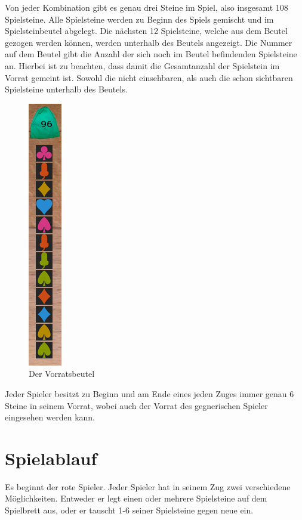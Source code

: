 \documentclass[a4paper, ngerman]{scrartcl}
\begin{document}
Von jeder Kombination gibt es genau drei Steine im Spiel, also insgesamt 108 Spielsteine. Alle Spielsteine werden zu Beginn des Spiels gemischt und im Spielsteinbeutel abgelegt. Die nächsten 12 Spielsteine, welche aus dem Beutel gezogen werden können, werden unterhalb des Beutels angezeigt. Die Nummer auf dem Beutel gibt die Anzahl der sich noch im Beutel befindenden Spielsteine an. Hierbei ist zu beachten, dass damit die Gesamtanzahl der Spielstein im Vorrat gemeint ist. Sowohl die nicht einsehbaren, als auch die schon sichtbaren Spielsteine unterhalb des Beutels.\\

\begin{figure}[h] \centering 
	\includegraphics[scale = 0.7]{images/Vorratsbeutel}
	\caption{Der Vorratsbeutel}
	\label{fig:Vorratsbeutel}
\end{figure}
Jeder Spieler besitzt zu Beginn und am Ende eines jeden Zuges immer genau 6 Steine in seinem Vorrat, wobei auch der Vorrat des gegnerischen Spieler eingesehen werden kann.\\


\section{Spielablauf}		
	Es beginnt der rote Spieler. Jeder Spieler hat in seinem Zug zwei verschiedene Möglichkeiten. Entweder er legt einen oder mehrere Spielsteine auf dem Spielbrett aus, oder er tauscht 1-6 seiner Spielsteine gegen neue ein.	
	
\end{document}
